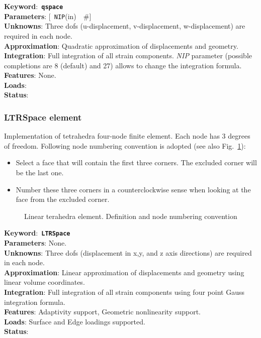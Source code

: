 \documentclass[a4paper]{article}
\newcommand{\descitem}[1]{{\noindent \bf #1}:}
\newcommand{\elemkeyword}[1]{\descitem{Keyword}~{\bf \texttt{#1}}}
\newcommand{\elemparam}[2]{{{\texttt{#1}\tiny (#2)}~~\#}}
\newcommand{\optelemparam}[2]{{[~\elemparam{#1}{#2}]}}
\newcommand{\param}[1]{{\em #1}}
\begin{document}
\elemkeyword{qspace}\\
\descitem{Parameters} \optelemparam{NIP}{in}\\
\descitem{Unknowns}
Three dofs (u-displacement, v-displacement, w-displacement) are required in each node.\\
\descitem{Approximation} Quadratic approximation of displacements and
geometry.\\
\descitem{Integration}
Full integration of all strain components.
\param{NIP} parameter (possible completions are 8 (default) and 27)
allows to change the integration formula.\\
\descitem{Features} None.\\
\descitem{Loads} \\
\descitem{Status} 

\subsubsection{LTRSpace element}
Implementation of tetrahedra four-node finite element. 
Each node has 3 degrees of freedom.
Following node numbering convention is adopted (see also Fig.~\ref{lintetrahedron_fig}):
\begin{itemize}
\item Select a face that will contain the first three corners. The excluded corner will be the last one.
\item Number these three corners in a counterclockwise sense when looking at the face from the
      excluded corner.
\end{itemize}
 
\begin{figure}[tb]
 \centering
 \begin{makeimage}
  
 \end{makeimage}
 \caption{Linear terahedra element. Definition and node numbering convention}
 \label{lintetrahedron_fig}
\end{figure}

\elemkeyword{LTRSpace}\\
\descitem{Parameters} None.\\
\descitem{Unknowns}
Three dofs (displacement in x,y, and z axis directions) are required in each node.\\
\descitem{Approximation} Linear approximation of displacements and
geometry using linear volume coordinates.\\
\descitem{Integration}
Full integration of all strain components using four point Gauss integration formula.\\
\descitem{Features} Adaptivity support, Geometric nonlinearity support.\\
\descitem{Loads} Surface and Edge loadings supported.\\
\descitem{Status} 
\end{document}
